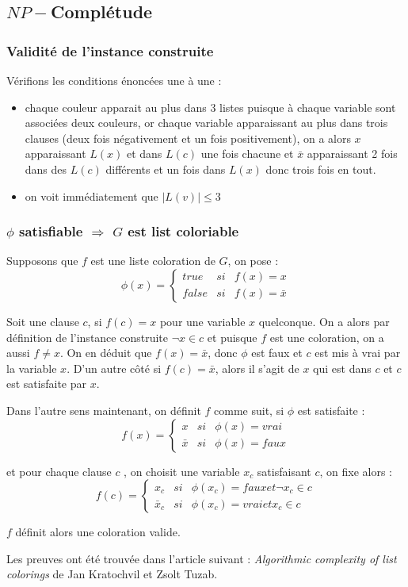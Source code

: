 \subsection{$NP-$Complétude}

\subsubsection{Validité de l'instance construite}

Vérifions les conditions énoncées une à une :
\begin{itemize}
	\item chaque couleur apparait au plus dans 3 listes puisque à chaque variable sont associées deux
		couleurs, or chaque variable apparaissant au plus dans trois clauses (deux fois négativement et
		un fois positivement), on a alors $x$ apparaissant $L(x)$ et dans $L(c)$ une fois chacune et
		$\bar x$ apparaissant 2 fois dans des $L(c)$ différents et un fois dans $L(x)$ donc trois fois en tout.
	\item on voit immédiatement que $|L(v)| \leq 3$ 
\end{itemize}

\subsubsection{$\phi$ satisfiable $\Rightarrow$ $G$ est list coloriable}

Supposons que $f$ est une liste coloration de $G$, on pose : $$
\phi(x) = \left \lbrace \begin{array}{rcl}
	true & si & f(x) = x \\
	false & si & f(x) = \bar x 
\end{array}
\right .
$$

Soit une clause $c$, si $f(c) = x$ pour une variable $x$ quelconque. On a alors par définition de
l'instance construite $\neg x \in c$ et puisque $f$ est une coloration, on a aussi $f \not = x$. On
en déduit que $f(x) = \bar x$, donc $\phi$ est faux et $c$ est mis à vrai par la variable $x$. D'un
autre côté si $f(c) = \bar x$, alors il s'agit de $x$ qui est dans $c$ et $c$ est satisfaite par
$x$.

Dans l'autre sens maintenant, on définit $f$ comme suit, si $\phi$ est satisfaite : $$
f(x) = \left \lbrace \begin{array}{rcl}
	x & si & \phi(x) = vrai \\
	\bar x & si & \phi(x) = faux
\end{array}
\right .
$$

et pour chaque clause $c$ , on choisit une variable $x_c$ satisfaisant $c$, on fixe alors : $$
f(c) = \left \lbrace \begin{array}{rcl}
	x_c & si & \phi(x_c) = faux et \neg x_c \in c \\
	\bar x_c & si & \phi(x_c) = vrai et x_c \in c
\end{array} \right .
$$

$f$ définit alors une coloration valide.

Les preuves ont été trouvée dans l'article suivant :
\emph{Algorithmic complexity of list colorings}
de Jan Kratochvil et Zsolt Tuzab.
